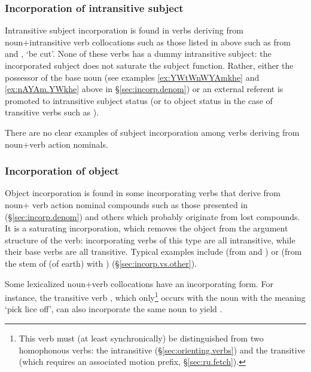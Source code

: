 \subsubsection{Incorporation of intransitive subject} \label{sec:incorp.S}
Intransitive subject incorporation is found in verbs deriving from noun+in\-tran\-si\-tive verb collocations such as those listed in  above such as  from  and , `be cut'. None of these verbs has a dummy intransitive subject: the incorporated subject does not saturate the subject function. Rather, either the possessor of the base noun (see examples  \ref{ex:YWtWnWYAmkhe} and \ref{ex:nAYAm.YWkhe} above in §\ref{sec:incorp.denom}) or an external referent is promoted to intransitive subject status (or to object status in the case of transitive verbs such as ).

There are no clear examples of subject incorporation among verbs deriving from noun+verb action nominals.

\subsubsection{Incorporation of object} \label{sec:incorp.O}
Object incorporation is found in some incorporating verbs that derive from noun+ verb action nominal compounds such as those presented in  (§\ref{sec:incorp.denom}) and others which probably originate from lost compounds. It is a saturating incorporation, which removes the object from the argument structure of the verb: incorporating verbs of this type are all intransitive, while their base verbs are all transitive. Typical examples include   (from  and	) or   (from the stem of  (of earth) with ) (§\ref{sec:incorp.vs.other}).


Some lexicalized noun+verb collocations have an incorporating form. For instance, the transitive verb , which only\footnote{This verb must (at least synchronically) be distinguished from two homophonous verbs: the intransitive  (§\ref{sec:orienting.verbs}) and the transitive  (which requires an associated motion prefix, §\ref{sec:ru.fetch}). } occurs with the noun  with the meaning `pick lice off', can also incorporate the same noun to yield .


